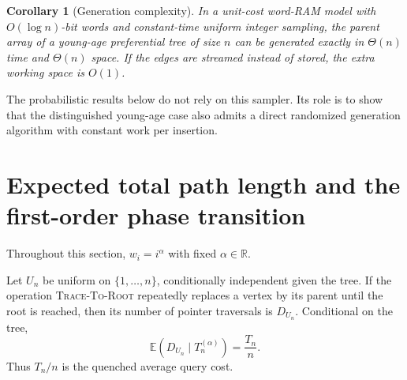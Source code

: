 \documentclass[11pt,a4paper]{article}
\newtheorem{corollary}[theorem]{Corollary}
\newcommand{\E}{\mathbb{E}}
\newcommand{\1}{\mathbf{1}}
\newcommand{\R}{\mathbb{R}}
\begin{document}
\begin{corollary}[Generation complexity]\label{cor:generator}
In a unit-cost word-RAM model with $O(\log n)$-bit words and constant-time
uniform integer sampling, the parent array of a young-age preferential tree
of size $n$ can be generated exactly in $\Theta(n)$ time and $\Theta(n)$
space.  If the edges are streamed instead of stored, the extra working space
is $O(1)$.
\end{corollary}

The probabilistic results below do not rely on this sampler.  Its role is to
show that the distinguished young-age case also admits a direct randomized
generation algorithm with constant work per insertion.

\section{Expected total path length and the first-order phase transition}
\label{sec:expectation}

Throughout this section, $w_i=i^\alpha$ with fixed $\alpha\in\R$.

Let $U_n$ be uniform on $\{1,\ldots,n\}$, conditionally independent given the
tree.  If the operation \textsc{Trace-To-Root} repeatedly replaces a vertex by
its parent until the root is reached, then its number of pointer traversals is
$D_{U_n}$.  Conditional on the tree,
\begin{equation}\label{eq:conditional-average}
\E(D_{U_n}\mid T_n^{(\alpha)})=\frac{T_n}{n}.
\end{equation}
Thus $T_n/n$ is the quenched average query cost.
\end{document}
